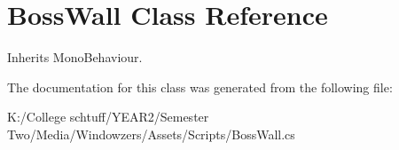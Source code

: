 \hypertarget{class_boss_wall}{}\section{Boss\+Wall Class Reference}
\label{class_boss_wall}


Inherits Mono\+Behaviour.



The documentation for this class was generated from the following file\+:\begin{DoxyCompactItemize}
\item 
K\+:/\+College schtuff/\+Y\+E\+A\+R2/\+Semester Two/\+Media/\+Windowzers/\+Assets/\+Scripts/Boss\+Wall.\+cs\end{DoxyCompactItemize}
